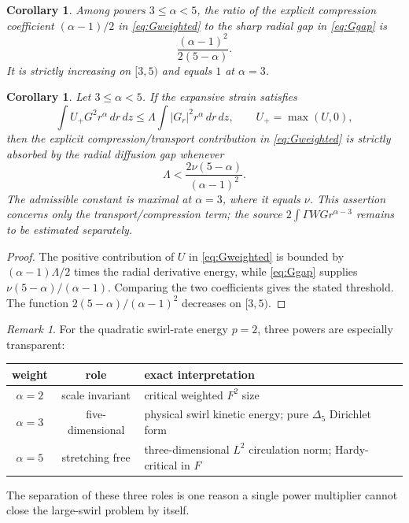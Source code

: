 \documentclass[11pt]{article}
\numberwithin{equation}{section}
\newtheorem{corollary}[theorem]{Corollary}
\theoremstyle{remark}
\newtheorem{remark}[theorem]{Remark}
\begin{document}
\begin{corollary}\label{cor:Gopt}
Among powers \(3\le\alpha<5\), the ratio of the explicit compression coefficient \((\alpha-1)/2\) in \eqref{eq:Gweighted} to the sharp radial gap in \eqref{eq:Ggap} is
\[
 \frac{(\alpha-1)^2}{2(5-\alpha)}.
\]
It is strictly increasing on \([3,5)\) and equals \(1\) at \(\alpha=3\).
\end{corollary}

\begin{corollary}\label{cor:G-formbound}
Let \(3\le\alpha<5\).  If the expansive strain satisfies
\[
 \int U_+G^2r^\alpha\,dr\,dz
 \le \Lambda\int|G_r|^2r^\alpha\,dr\,dz,
 \qquad U_+=\max(U,0),
\]
then the explicit compression/transport contribution in \eqref{eq:Gweighted} is strictly absorbed by the radial diffusion gap whenever
\[
 \Lambda<\frac{2\nu(5-\alpha)}{(\alpha-1)^2}.
\]
The admissible constant is maximal at \(\alpha=3\), where it equals \(\nu\).  This assertion concerns only the transport/compression term; the source \(2\int\Gamma WG r^{\alpha-3}\) remains to be estimated separately.
\end{corollary}

\begin{proof}
The positive contribution of \(U\) in \eqref{eq:Gweighted} is bounded by \((\alpha-1)\Lambda/2\) times the radial derivative energy, while \eqref{eq:Ggap} supplies \(\nu(5-\alpha)/(\alpha-1)\).  Comparing the two coefficients gives the stated threshold.  The function \(2(5-\alpha)/(\alpha-1)^2\) decreases on \([3,5)\).
\end{proof}

\begin{remark}\label{rem:threeweights}
For the quadratic swirl-rate energy \(p=2\), three powers are especially transparent:
\begin{center}
\begin{tabular}{ccl}
\toprule
weight & role & exact interpretation \\
\midrule
\(\alpha=2\) & scale invariant & critical weighted \(F^2\) size \\
\(\alpha=3\) & five-dimensional & physical swirl kinetic energy; pure \(\Delta_5\) Dirichlet form \\
\(\alpha=5\) & stretching free & three-dimensional \(L^2\) circulation norm; Hardy-critical in \(F\) \\
\bottomrule
\end{tabular}
\end{center}
The separation of these three roles is one reason a single power multiplier cannot close the large-swirl problem by itself.
\end{remark}
\end{document}
